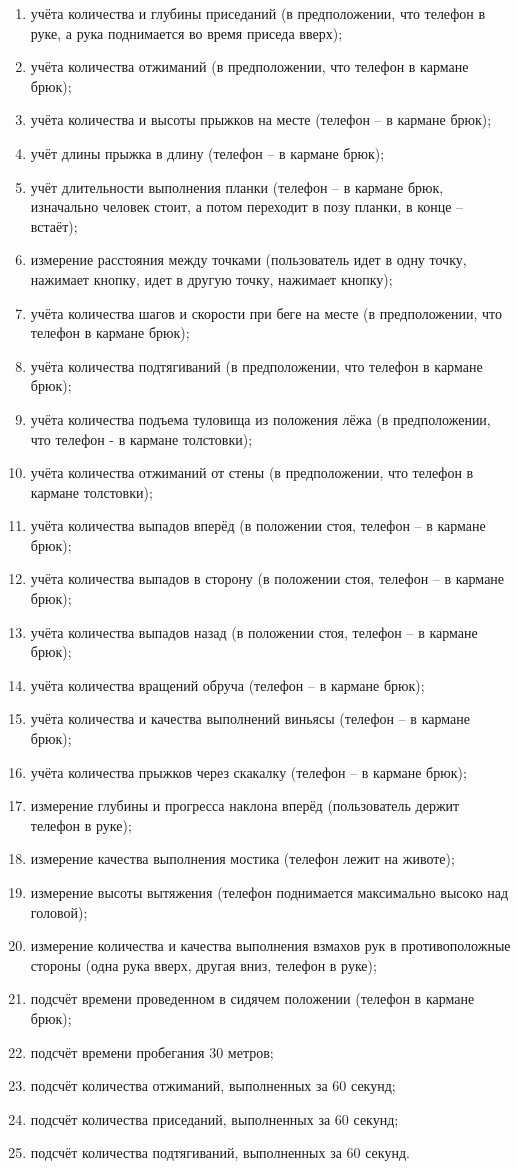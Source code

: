 \begin{enumerate}
	\item учёта количества и глубины приседаний (в предположении, что телефон в руке, а рука поднимается во время приседа вверх);
	\item учёта количества отжиманий (в предположении, что телефон в кармане брюк);
	\item учёта количества и высоты прыжков на месте (телефон -- в кармане брюк);
	\item учёт длины прыжка в длину (телефон -- в кармане брюк);
	\item учёт длительности выполнения планки (телефон -- в кармане брюк, изначально человек стоит, а потом переходит в позу планки, в конце -- встаёт);
	\item измерение расстояния между точками (пользователь идет в одну точку, нажимает кнопку, идет в другую точку, нажимает кнопку);
	\item учёта количества шагов и скорости при беге на месте (в предположении, что телефон в кармане брюк);
	\item учёта количества подтягиваний (в предположении, что телефон в кармане брюк);
	\item учёта количества подъема туловища из положения лёжа (в предположении, что телефон - в кармане толстовки);
	\item учёта количества отжиманий от стены (в предположении, что телефон в кармане толстовки);
	\item учёта количества выпадов вперёд (в положении стоя, телефон -- в кармане брюк);
	\item учёта количества выпадов в сторону (в положении стоя, телефон -- в кармане брюк);
	\item учёта количества выпадов назад (в положении стоя, телефон -- в кармане брюк);
	\item учёта количества вращений обруча (телефон -- в кармане брюк);
	\item учёта количества и качества выполнений виньясы (телефон -- в кармане брюк);
	\item учёта количества прыжков через скакалку (телефон -- в кармане брюк);
	\item измерение глубины и прогресса наклона вперёд (пользователь держит телефон в руке);
	\item измерение качества выполнения мостика (телефон лежит на животе);
	\item измерение высоты вытяжения (телефон поднимается максимально высоко над головой);
	\item измерение количества и качества выполнения взмахов рук в противоположные стороны (одна рука вверх, другая вниз, телефон в руке);
	\item подсчёт времени проведенном в сидячем положении (телефон в кармане брюк);
	\item подсчёт времени пробегания 30 метров;
	\item подсчёт количества отжиманий, выполненных за 60 секунд;
	\item подсчёт количества приседаний, выполненных за 60 секунд;
	\item подсчёт количества подтягиваний, выполненных за 60 секунд.
\end{enumerate}


